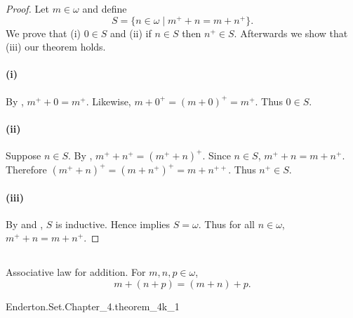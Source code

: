 \documentclass{report}
\begin{document}
  \begin{proof}

    Let $m \in \omega$ and define
      $$S = \{n \in \omega \mid m^+ + n = m + n^+\}.$$
    We prove that (i) $0 \in S$ and (ii) if $n \in S$ then $n^+ \in S$.
    Afterwards we show that (iii) our theorem holds.

    \paragraph{(i)}%

      By , $m^+ + 0 = m^+$.
      Likewise, $m + 0^+ = (m + 0)^+ = m^+$.
      Thus $0 \in S$.

    \paragraph{(ii)}%

      Suppose $n \in S$.
      By , $m^+ + n^+ = (m^+ + n)^+$.
      Since $n \in S$, $m^+ + n = m + n^+$.
      Therefore $(m^+ + n)^+ = (m + n^+)^+ = m + n^{++}$.
      Thus $n^+ \in S$.

    \paragraph{(iii)}%

      By  and , $S$ is inductive.
      Hence  implies $S = \omega$.
      Thus for all $n \in \omega$, $m^+ + n = m + n^+$.

  \end{proof}

\subsection{}%

  \begin{theorem}[4K-1]
    Associative law for addition.
    For $m, n, p \in \omega$, $$m + (n + p) = (m + n) + p.$$
  \end{theorem}

    {Enderton.Set.Chapter\_4.theorem\_4k\_1}

\end{document}
